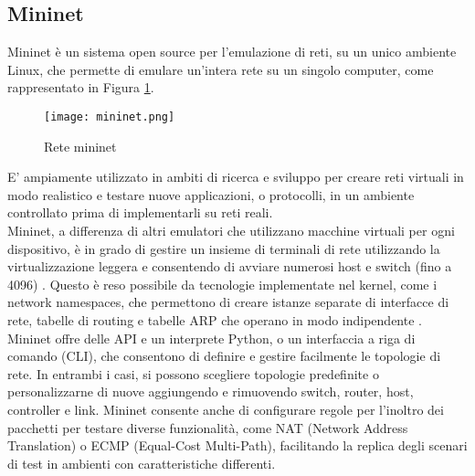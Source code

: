 \subsection{Mininet}
\label{ch:Mininet}
Mininet \cite{mininet} è un sistema open source per l'emulazione di reti, su un unico ambiente Linux, che permette di emulare un'intera rete su un singolo computer, come rappresentato in Figura \ref{fig:mininet}.
\begin{figure}[h]
    \centering
   \texttt{[image: mininet.png]}
    \caption{Rete mininet}
    \label{fig:mininet}
\end{figure}
E' ampiamente utilizzato in ambiti di ricerca e sviluppo per creare reti virtuali in modo realistico e testare nuove applicazioni, o protocolli, in un ambiente controllato prima di implementarli su reti reali.
\\Mininet, a differenza di altri emulatori che utilizzano macchine virtuali per ogni dispositivo, è in grado di gestire un insieme di terminali di rete
utilizzando la virtualizzazione leggera e consentendo di avviare numerosi host e switch (fino a 4096) \cite{MininetOv}.
Questo è reso possibile da tecnologie implementate nel kernel, come i network namespaces, %
che permettono di creare istanze separate di interfacce di rete, tabelle di routing e tabelle ARP che operano in modo indipendente \cite{tesiMininet}. 
\\Mininet offre delle API e un interprete Python, o un interfaccia a riga di comando (CLI), che consentono di definire e gestire facilmente le topologie di rete.
In entrambi i casi, si possono scegliere topologie predefinite o personalizzarne di nuove aggiungendo e rimuovendo switch, router, host, controller e link.
Mininet consente anche di configurare regole per l'inoltro dei pacchetti per testare diverse funzionalità, come NAT (Network Address Translation) o ECMP (Equal-Cost Multi-Path), facilitando la replica degli scenari di test in ambienti con caratteristiche differenti.
